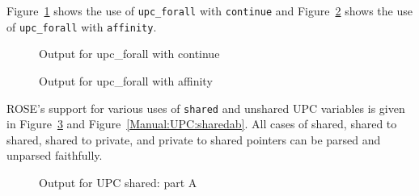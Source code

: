 Figure~\ref{Manual:UPC:forall1} shows the use of \lstinline{upc_forall}
with \lstinline{continue} and Figure~\ref{Manual:UPC:forall2} shows the use
of \lstinline{upc_forall} with \lstinline{affinity}.

\begin{figure}[!h]
{\indent
  {\mySmallFontSize
    \begin{latexonly}
    
    \end{latexonly}
    \begin{htmlonly}
    
    \end{htmlonly}
  }
}
\caption{Output for upc\_forall with continue}
\label{Manual:UPC:forall1}
\end{figure}

\begin{figure}[!h]
{\indent
  {\mySmallFontSize
    \begin{latexonly}
    
    \end{latexonly}
    \begin{htmlonly}
    
    \end{htmlonly}
  }
}
\caption{Output for upc\_forall with affinity }
\label{Manual:UPC:forall2}
\end{figure}

\clearpage
ROSE's support for various uses of \lstinline{shared} and unshared UPC
variables is given in
Figure~\ref{Manual:UPC:sharedaa} and Figure~\ref{Manual:UPC:sharedab}. 
All cases of shared, shared to shared, shared to private, and private to
shared pointers can be parsed and unparsed faithfully.
\begin{figure}[!h]
{\indent
  {\mySmallFontSize
    \begin{latexonly}
    
    \end{latexonly}
    \begin{htmlonly}
    
    \end{htmlonly}
  }
}
\caption{Output for UPC shared: part A}
\label{Manual:UPC:sharedaa}
\end{figure}

